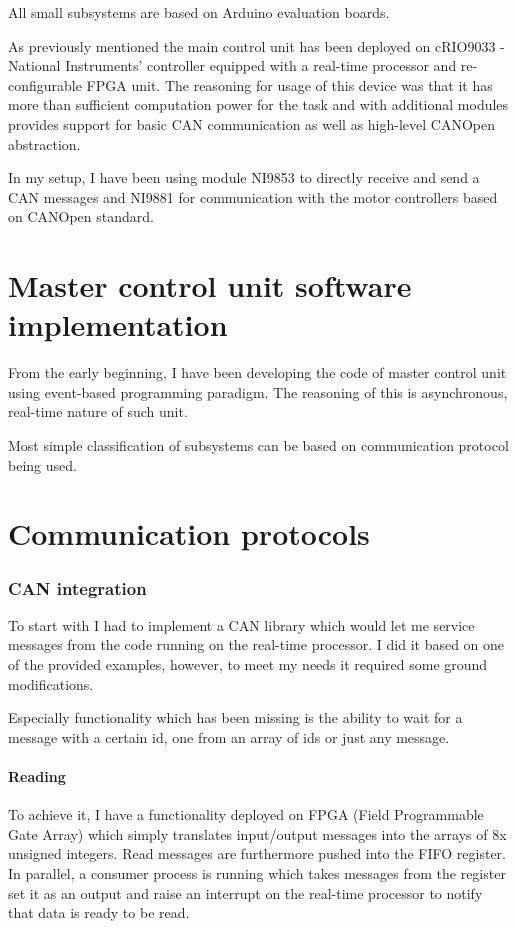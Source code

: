 All small subsystems are based on Arduino evaluation boards.




As previously mentioned the main control unit has been deployed on cRIO9033 - National Instruments' controller equipped with a real-time processor and re-configurable FPGA unit. The reasoning for usage of this device was that it has more than sufficient computation power for the task and with additional modules provides support for basic CAN communication as well as high-level CANOpen abstraction.


In my setup, I have been using module NI9853 to directly receive and send a CAN messages and NI9881 for communication with the motor controllers based on CANOpen standard.

\section{Master control unit software implementation}
From the early beginning, I have been developing the code of master control unit using event-based programming paradigm. The reasoning of this is asynchronous, real-time nature of such unit.

Most simple classification of subsystems can be based on communication protocol being used. 

\section{Communication protocols}

\subsubsection{CAN integration}
To start with I had to implement a CAN library which would let me service messages from the code running on the real-time processor. I did it based on one of the provided examples, however, to meet my needs it required some ground modifications.

Especially functionality which has been missing is the ability to wait for a message with a certain id, one from an array of ids or just any message. 
\paragraph{Reading}

To achieve it, I have a functionality deployed on FPGA (Field Programmable Gate Array) which simply translates input/output messages into the arrays of 8x unsigned integers. Read messages are furthermore pushed into the FIFO register. In parallel, a consumer process is running which takes messages from the register set it as an output and raise an interrupt on the real-time processor to notify that data is ready to be read.

